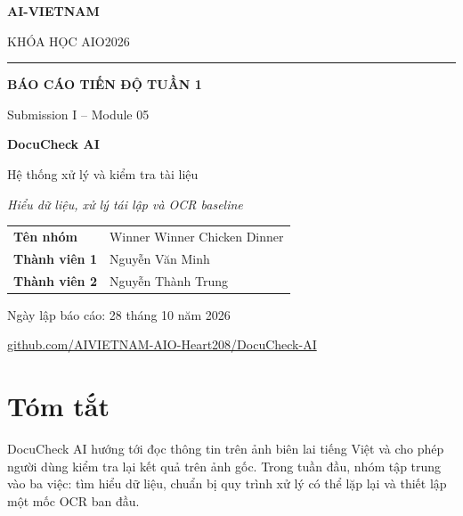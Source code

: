 \documentclass[11pt,a4paper]{article}
\renewcommand{\arraystretch}{1.25}
\begin{document}
\color{ink}

\begin{titlepage}
\thispagestyle{empty}
\centering
\setlength{\parskip}{0pt}
\vspace*{7mm}
{\sffamily\fontsize{16}{21}\selectfont\bfseries\color{navy}AI-VIETNAM}\par
\vspace{3mm}
{\sffamily\fontsize{11}{16}\selectfont KHÓA HỌC AIO2026}\par
\vspace{7mm}
{\color{navy!35}\rule{72mm}{.45pt}}\par
\vspace{25mm}
{\fontsize{23}{31}\selectfont\bfseries\color{navy}BÁO CÁO TIẾN ĐỘ TUẦN 1}\par
\vspace{5mm}
{\sffamily\fontsize{12}{17}\selectfont\color{teal}Submission I -- Module 05}\par
\vspace{17mm}
{\fontsize{29}{35}\selectfont\bfseries\color{navy}DocuCheck AI}\par
\vspace{3mm}
{\fontsize{14}{19}\selectfont Hệ thống xử lý và kiểm tra tài liệu}\par
\vspace{7mm}
{\fontsize{11}{16}\selectfont\itshape
Hiểu dữ liệu, xử lý tái lập và OCR baseline}\par
\vspace{24mm}
\begin{minipage}{114mm}
\normalsize
\renewcommand{\arraystretch}{1.65}
\begin{tabularx}{\linewidth}{@{}P{32mm}Y@{}}
\textbf{Tên nhóm} & Winner Winner Chicken Dinner\\
\textbf{Thành viên 1} & Nguyễn Văn Minh\\
\textbf{Thành viên 2} & Nguyễn Thành Trung\\
\end{tabularx}
\end{minipage}
\vfill
{\small Ngày lập báo cáo: 28 tháng 10 năm 2026}\par
\vspace{6mm}
{\footnotesize\href{https://github.com/AIVIETNAM-AIO-Heart208/DocuCheck-AI}{\textsf{github.com/AIVIETNAM-AIO-Heart208/DocuCheck-AI}}}\par
\vspace*{8mm}
\end{titlepage}

\section*{Tóm tắt}
DocuCheck AI hướng tới đọc thông tin trên ảnh biên lai tiếng Việt và cho phép người dùng kiểm tra lại kết quả trên ảnh gốc. Trong tuần đầu, nhóm tập trung vào ba việc: tìm hiểu dữ liệu, chuẩn bị quy trình xử lý có thể lặp lại và thiết lập một mốc OCR ban đầu.
\end{document}
